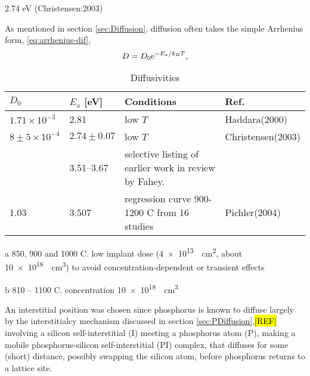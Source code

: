 \documentclass[11pt,bibliography=totoc,index=totoc]{scrbook}   %
\newcommand{\comment}[1]{\hl{#1}}
\begin{document}
2.74 eV (Christensen:2003)

As mentioned in section \ref{sec:Diffusion}, diffusion often takes the simple Arrhenius form, \eqref{eq:arrhenius-dif},
\begin{equation*}
    D = D_0 \mathrm{e}^{-E_a/k_BT},
\end{equation*}


\begin{table}[htbp]
  \centering
  \begin{threeparttable}[htbp]
  \begin{tabular}{llll}
      \toprule
        $D_0$ & $E_a$ [eV] & Conditions & Ref. \\
      \midrule
      $1.71\times 10^{-3}$ & 2.81 & low $T$\tnote{a} & Haddara(2000)\cite{Haddara:2000} \\
      $8\pm5\times 10^{-4}$ & $2.74\pm 0.07$ & low $T$\tnote{b} & Christensen(2003)\cite{Christensen:2003} \\
      & 3.51–3.67 & selective listing of earlier work in review by Fahey.\cite[320]{Fahey:1989} \\
      1.03 & 3.507 & regression curve 900-1200 C from 16 studies & Pichler(2004)\cite{Pichler:2004} \\
      \bottomrule
    \end{tabular}
    {\footnotesize
        \begin{tablenotes}
          \item[a] 850, 900 and 1000 C.
            low implant dose (\SI{4e13}{\per\centi\metre\squared}, about \SI{10e18}{\per\centi\metre\cubed}) to 
            avoid concentration-dependent or transient effects
          \item[b] 810 – 1100 C. concentration \SI{10e18}{\per\centi\metre\cubed}
        \end{tablenotes}
    }
  \end{threeparttable}
  \caption{Diffusivities}
  \label{tab:Label}
\end{table}

An interstitial position was chosen since phosphorus is known to diffuse largely by 
the interstitialcy mechanism discussed in section \ref{sec:PDiffusion},\comment{[REF]}
involving a silicon self-interstitial (I) meeting 
a phosphorus atom (P), making a mobile phosphorus-silicon self-interstitial (PI) complex, 
that diffuses for some (short) distance, possibly swapping the silicon atom, before phosphorus 
returns to a lattice site.
\end{document}
